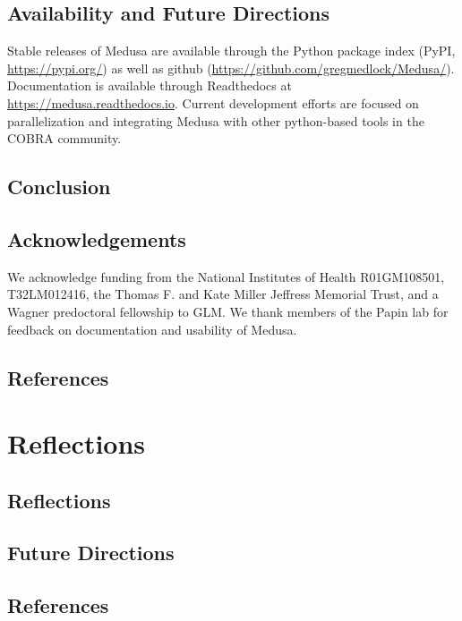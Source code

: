 \documentclass[11pt,twocolumn,notitlepage,openany,twoside]{book}
\begin{document}
\begin{refsection}
\section{Availability and Future Directions}

Stable releases of Medusa are available through the Python package index (PyPI, \url{https://pypi.org/}) as well as github (\url{https://github.com/gregmedlock/Medusa/}). Documentation is available through Readthedocs at \url{https://medusa.readthedocs.io}. Current development efforts are focused on parallelization and integrating Medusa with other python-based tools in the COBRA community.

\section{Conclusion}

\section{Acknowledgements}

We acknowledge funding from the National Institutes of Health R01GM108501, T32LM012416, the Thomas F. and Kate Miller Jeffress Memorial Trust, and a Wagner predoctoral fellowship to GLM. We thank members of the Papin lab for feedback on documentation and usability of Medusa.

\section{References}

\printbibliography[heading=none]
\end{refsection}

\chapter{Reflections}
\begin{refsection}

\section{Reflections}

\section{Future Directions}

\section{References}

\printbibliography[heading=none]
\end{refsection}
\end{document}
